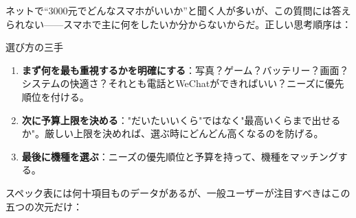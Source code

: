 


ネットで“3000元でどんなスマホがいいか”と聞く人が多いが、この質問には答えられない——スマホで主に何をしたいか分からないからだ。正しい思考順序は：

\begin{tcbinfo}{選び方の三手}
\begin{enumerate}
  \item \textbf{まず何を最も重視するかを明確にする}：写真？ゲーム？バッテリー？画面？システムの快適さ？それとも電話とWeChatができればいい？ニーズに優先順位を付ける。
  \item \textbf{次に予算上限を決める}："だいたいいくら"ではなく"最高いくらまで出せるか"。厳しい上限を決めれば、選ぶ時にどんどん高くなるのを防げる。
  \item \textbf{最後に機種を選ぶ}：ニーズの優先順位と予算を持って、機種をマッチングする。
\end{enumerate}

\end{tcbinfo}


スペック表には何十項目ものデータがあるが、一般ユーザーが注目すべきはこの五つの次元だけ：

